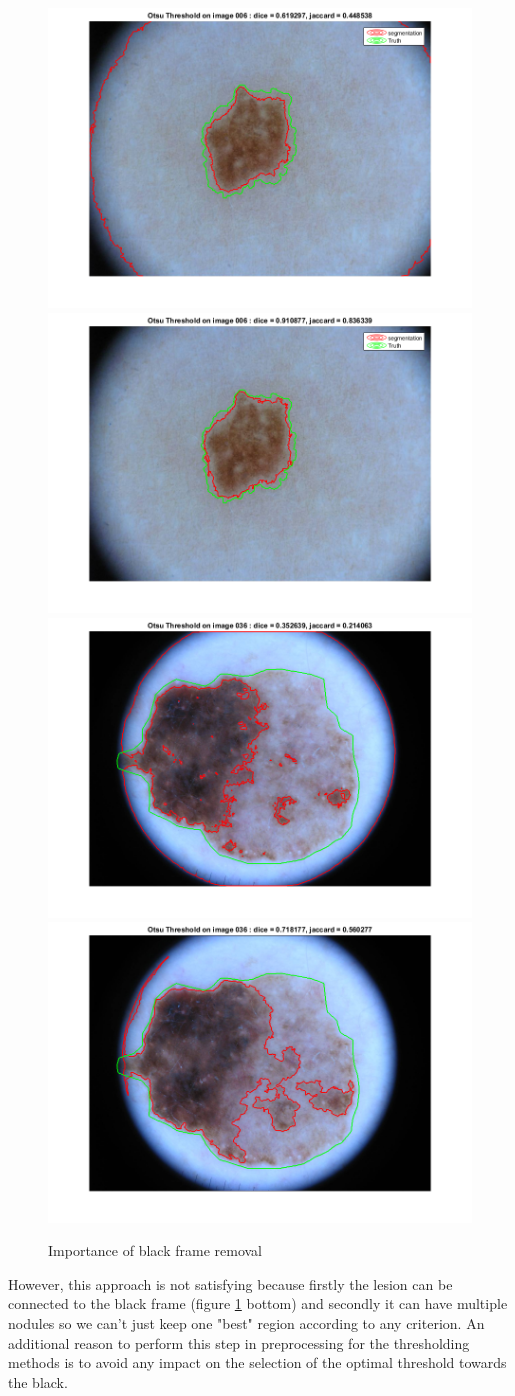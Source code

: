 \documentclass[a4paper,10pt]{article}
\begin{document}
\begin{figure} [h]
	\centering
	\includegraphics[width=0.45\linewidth]{../results/blackframe/otsu_006_blackframe.png} 
	\includegraphics[width=0.45\linewidth]{../results/blackframe/otsu-segt-im-006.png} \\
	\includegraphics[width=0.45\linewidth]{../results/blackframe/otsu-noblack-036}
	\includegraphics[width=0.45\linewidth]{../results/blackframe/otsu-black-036}
	\caption{Importance of black frame removal}
	\label{fig:blackframe}
\end{figure} 
 However, this approach is not satisfying because firstly the lesion can be connected to the black frame (figure \ref{fig:blackframe} bottom) and secondly it can have multiple nodules so we can't just keep one "best" region according to any criterion. An additional reason to perform this step in preprocessing for the thresholding methods is to avoid any impact on the selection of the optimal threshold towards the black.
\end{document}
